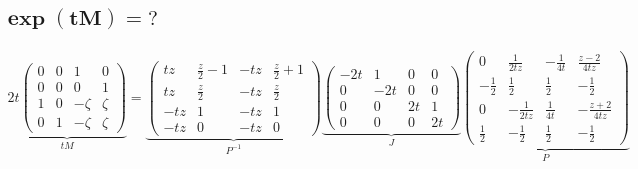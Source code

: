 \documentclass[10pt,a4paper]{article}
\newcommand{\mat}[1]{
    \begin{pmatrix}
        #1
    \end{pmatrix}
}
\begin{document}
\subsection{
    \texorpdfstring{
        $\pmb{ \exp(tM) = \mathit{?} }$
    }{
        exp(tM) = ?
    }
}
\begin{align*}
    \underbrace{
        2t
        \mat{
            0 & 0 & 1 & 0 \\
            0 & 0 & 0 & 1 \\
            1 & 0 & - \zeta & \zeta \\
            0 & 1 & - \zeta & \zeta
        }
    }_{
        tM
    }
    =
    \underbrace{
        \mat{t z & \frac{z}{2} - 1 & - t z & \frac{z}{2} + 1\\t z & \frac{z}{2} & - t z & \frac{z}{2}\\- t z & 1 & - t z & 1\\- t z & 0 & - t z & 0}
    }_{
        P^{-1}
    }
    \underbrace{
        \mat{- 2 t & 1 & 0 & 0\\0 & - 2 t & 0 & 0\\0 & 0 & 2 t & 1\\0 & 0 & 0 & 2 t}
    }_{
        J
    }
    \underbrace{
        \mat{0 & \frac{1}{2 t z} & - \frac{1}{4 t} & \frac{z - 2}{4 t z}\\- \frac{1}{2} & \frac{1}{2} & \frac{1}{2} & - \frac{1}{2}\\0 & - \frac{1}{2 t z} & \frac{1}{4 t} & - \frac{z + 2}{4 t z}\\\frac{1}{2} & - \frac{1}{2} & \frac{1}{2} & - \frac{1}{2}}
    }_{
        P
    }
\end{align*}
\end{document}
